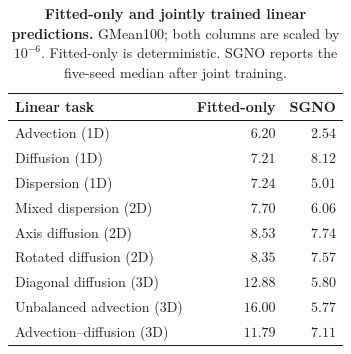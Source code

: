 \begin{table}[!htbp]
\centering\small
\caption{\textbf{Fitted-only and jointly trained linear predictions.} GMean100; both columns are scaled by $10^{-6}$. Fitted-only is deterministic. SGNO reports the five-seed median after joint training.}
\label{tab:linear-fitted-only}
\setlength{\tabcolsep}{8pt}\renewcommand{\arraystretch}{1.15}
\begin{tabular*}{\linewidth}{@{\extracolsep{\fill}}lrr@{}}
\toprule
Linear task & Fitted-only & SGNO \\
\midrule
Advection (1D) & $6.20$ & $2.54$ \\
Diffusion (1D) & $7.21$ & $8.12$ \\
Dispersion (1D) & $7.24$ & $5.01$ \\
Mixed dispersion (2D) & $7.70$ & $6.06$ \\
Axis diffusion (2D) & $8.53$ & $7.74$ \\
Rotated diffusion (2D) & $8.35$ & $7.57$ \\
Diagonal diffusion (3D) & $12.88$ & $5.80$ \\
Unbalanced advection (3D) & $16.00$ & $5.77$ \\
Advection--diffusion (3D) & $11.79$ & $7.11$ \\
\bottomrule
\end{tabular*}
\end{table}
